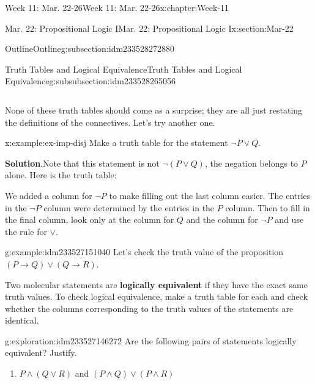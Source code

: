\documentclass[oneside,10pt,]{book}
\newcommand{\blocktitlefont}{\relax}
\newcommand{\tabularfont}{\relax}
\newcommand{\terminology}[1]{\textbf{#1}}
\numberwithin{equation}{section}
\newcommand{\hrulethin}  {\noalign{\hrule height 0.04em}}
\begin{document}
\begin{chapterptx}{Week 11: Mar. 22-26}{}{Week 11: Mar. 22-26}{}{}{x:chapter:Week-11}
\begin{sectionptx}{Mar. 22: Propositional Logic I}{}{Mar. 22: Propositional Logic I}{}{}{x:section:Mar-22}
\begin{subsectionptx}{Outline}{}{Outline}{}{}{g:subsection:idm233528272880}
\begin{subsubsectionptx}{Truth Tables and Logical Equivalence}{}{Truth Tables and Logical Equivalence}{}{}{g:subsubsection:idm233528265056}
\begin{sidebyside}{1}{0}{0}{0}
\begin{sbspanel}{1}
{{{\begin{tabular}{cBc}
\end{tabular}
}%
\par}
}%
\end{sbspanel}%
\end{sidebyside}%
\par
None of these truth tables should come as a surprise; they are all just restating the definitions of the connectives. Let's try another one.%
\begin{example}{}{x:example:ex-imp-disj}%
Make a truth table for the statement \(\neg P \vee Q\).%
\par\smallskip%
\noindent\textbf{\blocktitlefont Solution}.\hypertarget{p:solution:QRL}{}\quad{}Note that this statement is not \(\neg(P \vee Q)\), the negation belongs to \(P\) alone. Here is the truth table:%
\begin{sidebyside}{1}{0}{0}{0}%
\begin{sbspanel}{1}%
\resizebox{\linewidth}{!}{%
{\centering%
{\tabularfont%
\begin{tabular}{cAcBcAc}
\(P\)&\(Q\)&\(\neg P\)&\(\neg P \vee Q\)\tabularnewline\hrulethin
T&T&F&T\tabularnewline[0pt]
T&F&F&F\tabularnewline[0pt]
F&T&T&T\tabularnewline[0pt]
F&F&T&T
\end{tabular}
}%
\par}
}%
\end{sbspanel}%
\end{sidebyside}%
\par
We added a column for \(\neg P\) to make filling out the last column easier. The entries in the \(\neg P\) column were determined by the entries in the \(P\) column. Then to fill in the final column, look only at the column for \(Q\) and the column for \(\neg P\) and use the rule for \(\vee\).%
\end{example}
\begin{example}{}{g:example:idm233527151040}%
Let's check the truth value of the proposition \((P\to Q) \lor (Q\to R)\).%
\end{example}
Two molecular statements are \terminology{logically equivalent} if they have the exact same truth values. To check logical equivalence, make a truth table for each and check whether the columns corresponding to the truth values of the statements are identical.%
\begin{exploration}{}{g:exploration:idm233527146272}%
Are the following pairs of statements logically equivalent? Justify.%
%
\begin{enumerate}
\item{}\(P\land (Q\lor R)\) and \((P\land Q) \lor (P\land R)\)%

\end{enumerate}
\end{exploration}
\end{subsubsectionptx}
\end{subsectionptx}
\end{sectionptx}
\end{chapterptx}
\end{document}
